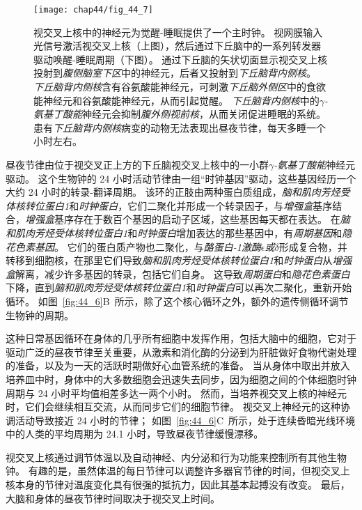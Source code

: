 \begin{figure}[htbp]
	\centering
	\texttt{[image: chap44/fig\_44\_7]}
	\caption{视交叉上核中的神经元为觉醒-睡眠提供了一个主时钟。
		视网膜输入光信号激活视交叉上核（上图），然后通过下丘脑中的一系列转发器驱动唤醒-睡眠周期（下图）。
		通过下丘脑的矢状切面显示视交叉上核投射到\textit{腹侧脑室下区}中的神经元，后者又投射到\textit{下丘脑背内侧核}。
		\textit{下丘脑背内侧核}含有谷氨酸能神经元，可刺激\textit{下丘脑外侧区}中的食欲能神经元和谷氨酸能神经元，从而引起觉醒。
		\textit{下丘脑背内侧核}中的\textit{$\gamma$-氨基丁酸能}神经元会抑制\textit{腹外侧视前核}，从而关闭促进睡眠的系统。
		患有\textit{下丘脑背内侧核}病变的动物无法表现出昼夜节律，每天多睡一个小时左右。}
	\label{fig:44_7}
\end{figure}


昼夜节律由位于视交叉正上方的下丘脑视交叉上核中的一小群\textit{$\gamma$-氨基丁酸能}神经元驱动。
这个生物钟的 24 小时活动节律由一组“时钟基因”驱动，这些基因经历一个大约 24 小时的转录-翻译周期。
该环的正肢由两种蛋白质组成，\textit{脑和肌肉芳烃受体核转位蛋白1}和\textit{时钟蛋白}，它们二聚化并形成一个转录因子，与\textit{增强盒}基序结合，\textit{增强盒}基序存在于数百个基因的启动子区域，这些基因每天都在表达。
在\textit{脑和肌肉芳烃受体核转位蛋白1}和\textit{时钟蛋白}增加表达的那些基因中，有\textit{周期基因}和\textit{隐花色素基因}。
它们的蛋白质产物也二聚化，与\textit{酪蛋白-1激酶$\epsilon$或$\delta$}形成复合物，并转移到细胞核，在那里它们导致\textit{脑和肌肉芳烃受体核转位蛋白1}和\textit{时钟蛋白}从\textit{增强盒}解离，减少许多基因的转录，包括它们自身。
这导致\textit{周期蛋白}和\textit{隐花色素蛋白}下降，直到\textit{脑和肌肉芳烃受体核转位蛋白1}和\textit{时钟蛋白}可以再次二聚化，重新开始循环。
如图~\ref{fig:44_6}B~所示，除了这个核心循环之外，额外的遗传侧循环调节生物钟的周期。


这种日常基因循环在身体的几乎所有细胞中发挥作用，包括大脑中的细胞，它对于驱动广泛的昼夜节律至关重要，从激素和消化酶的分泌到为肝脏做好食物代谢处理的准备，以及为一天的活跃时期做好心血管系统的准备。
当从身体中取出并放入培养皿中时，身体中的大多数细胞会迅速失去同步，因为细胞之间的个体细胞时钟周期与 24 小时平均值相差多达一两个小时。
然而，当培养视交叉上核的神经元时，它们会继续相互交流，从而同步它们的细胞节律。
视交叉上神经元的这种协调活动导致接近 24 小时的节律；
如图~\ref{fig:44_6}C~所示，处于连续昏暗光线环境中的人类的平均周期为 24.1 小时，导致昼夜节律缓慢漂移。


视交叉上核通过调节体温以及自动神经、内分泌和行为功能来控制所有其他生物钟。
有趣的是，虽然体温的每日节律可以调整许多器官节律的时间，但视交叉上核本身的节律对温度变化具有很强的抵抗力，因此其基本起搏没有改变。
最后，大脑和身体的昼夜节律时间取决于视交叉上时间。


